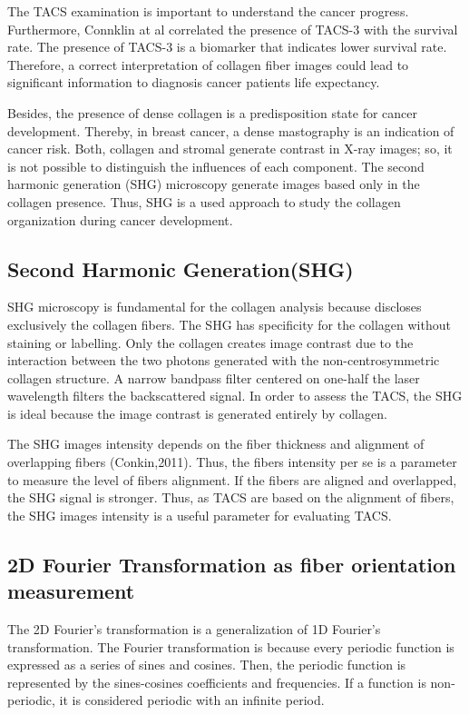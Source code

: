 \documentclass[12pt,a4paper]{article}
\begin{document}
The TACS examination is important to understand the cancer progress. Furthermore, Connklin at al correlated the presence of TACS-3 with the survival rate. The presence of TACS-3 is a biomarker that indicates lower   survival rate. Therefore, a correct interpretation of  collagen fiber images could lead to significant information to diagnosis cancer patients life expectancy.

Besides, the presence of dense collagen is a predisposition state for  cancer development. Thereby, in breast cancer, a dense mastography is an indication of cancer risk. Both, collagen and  stromal generate contrast in X-ray images; so, it is not possible to distinguish the influences of each component. The second harmonic generation (SHG) microscopy generate images based only in the collagen presence. Thus, SHG is a used approach to study the collagen organization during cancer development.
\subsection{Second Harmonic Generation(SHG)}
SHG microscopy is fundamental for the collagen analysis because discloses exclusively the collagen fibers. The SHG has specificity for the collagen without staining or labelling. Only the collagen creates image contrast due to the interaction between the two photons generated with the non-centrosymmetric collagen structure. A narrow bandpass filter centered on one-half the laser wavelength filters the backscattered signal. In order to assess the TACS, the SHG is ideal because the image contrast is generated entirely by collagen. 

The SHG images intensity depends on the fiber thickness and alignment of overlapping fibers (Conkin,2011). Thus, the fibers intensity per se is a parameter to measure the level of fibers alignment. If the fibers are aligned and overlapped, the SHG signal is stronger. Thus, as TACS are based on the alignment of fibers, the SHG images intensity is a useful parameter for evaluating TACS.
\subsection{2D Fourier Transformation as fiber orientation measurement}
The 2D Fourier's transformation is a generalization of 1D Fourier's transformation. The Fourier transformation is because every periodic function is expressed as a series of sines and cosines. Then, the periodic function is represented by the sines-cosines coefficients and frequencies. If a function is non-periodic, it is considered periodic with an infinite period.
\end{document}
